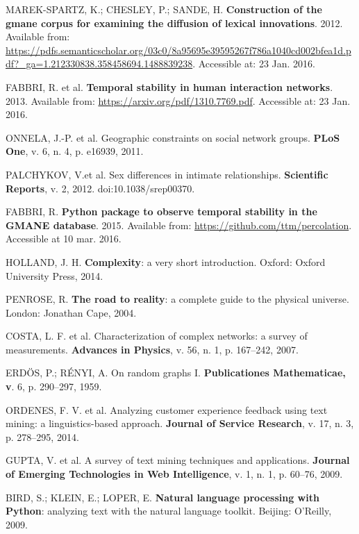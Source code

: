 \documentclass[
12pt,		%
openright,	%
twoside,  %
a4paper,			%
chapter=TITLE,		%
english,			%
french,				%
spanish,			%
brazil				%
]{USPSC}
\begin{document}
\begin{thebibliography}{999}
	MAREK-SPARTZ, K.; CHESLEY, P.; SANDE, H. \textbf{Construction of the gmane corpus for examining the diffusion of lexical innovations}. 2012. Available from: \url{https://pdfs.semanticscholar.org/03c0/8a95695e39595267f786a1040cd002bfea1d.pdf?_ga=1.212330838.358458694.1488839238}. Accessible  at: 23 Jan. 2016.

	FABBRI, R. et al. \textbf{Temporal stability in human interaction networks}. 2013. Available from: \url{https://arxiv.org/pdf/1310.7769.pdf}. Accessible at: 23 Jan. 2016.

	ONNELA, J.-P. et al. Geographic constraints on social network groups. \textbf{PLoS One}, v. 6, n. 4, p. e16939, 2011.

	PALCHYKOV, V.et al. Sex differences in intimate relationships. \textbf{Scientific Reports}, v. 2, 2012. doi:10.1038/srep00370.

	FABBRI, R. \textbf{Python package to observe temporal stability in the GMANE database}. 2015. Available from: \url{https://github.com/ttm/percolation}. Accessible at 10 mar. 2016.

	HOLLAND, J. H. \textbf{Complexity}: a very short introduction. Oxford: Oxford University Press, 2014.

	PENROSE, R. \textbf{The road to reality}: a complete guide to the physical universe. London: Jonathan Cape, 2004.

	COSTA, L. F. et al. Characterization of complex networks: a survey of measurements. \textbf{Advances in Physics}, v. 56, n. 1, p. 167–242, 2007.

	ERDÖS, P.; RÉNYI, A. On random graphs I. \textbf{Publicationes Mathematicae, v}. 6, p. 290–297, 1959.

	ORDENES, F. V. et al. Analyzing customer experience feedback using text mining: a linguistics-based approach. \textbf{Journal of Service Research}, v. 17, n. 3, p. 278–295, 2014.

	GUPTA, V. et al. A survey of text mining techniques and applications. \textbf{Journal of Emerging Technologies in Web Intelligence}, v. 1, n. 1, p. 60–76, 2009.

	BIRD, S.; KLEIN, E.; LOPER, E. \textbf{Natural language processing with Python}: analyzing text with the natural language toolkit. Beijing: O'Reilly, 2009.


\end{thebibliography}
\end{document}
